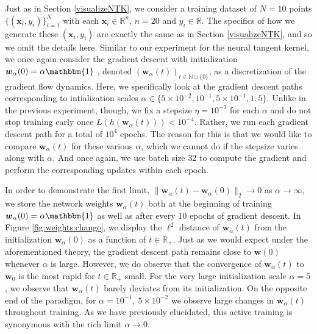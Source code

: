 \documentclass{article}
\begin{document}
Just as in Section \ref{visualizeNTK}, we consider a training dataset of $N = 10$ points $\{(\boldsymbol{x}_i, y_i) \}_{i=1}^N$ with each $\boldsymbol{x}_i \in \mathbb{R}^n$, $n=20$ and $y_i \in \mathbb{R}$. The specifics of how we generate these $(\boldsymbol{x}_i, y_i)$ are exactly the same as in Section \ref{visualizeNTK}, and so we omit the details here. Similar to our experiment for the neural tangent kernel, we once again consider the gradient descent with initialization $\boldsymbol{w}_{\alpha}(0) = \alpha \mathbbm{1}$ , denoted $(\boldsymbol{w}_{\alpha}(t))_{t \in \mathbb{N} \cup \{ 0\}}$, as a discretization of the gradient flow dynamics. Here, we specifically look at the gradient descent paths corresponding to intialization scales $\alpha \in \{ 5\times10^{-2}, 10^{-1}, 5 \times 10^{-1}, 1, 5\}$. Unlike in the previous experiment, though, we fix a stepsize $\eta = 10^{-3}$ for each $\alpha$ and do not stop training early once $L(h(\boldsymbol{w}_{\alpha}(t))) < 10^{-4}$. Rather, we run each gradient descent path for a total of $10^4$ epochs. The reason for this is that we would like to compare $\boldsymbol{w}_{\alpha}(t)$ for these various $\alpha$, which we cannot do if the stepsize varies along with $\alpha$. And once again, we use batch size $32$ to compute the gradient and perform the corresponding updates within each epoch.

In order to demonstrate the first limit, $\| \boldsymbol{w}_{\alpha}(t) - \boldsymbol{w}_{\alpha}(0) \|_2 \rightarrow 0$ as $\alpha \rightarrow \infty$, we store the network weights $\boldsymbol{w}_{\alpha}(t)$ both at the beginning of training $\boldsymbol{w}_{\alpha}(0) = \alpha \mathbbm{1}$ as well as after every 10 epochs of gradient descent. In Figure \ref{fig:weights:change}, we display the $\ell^2$ distance of $\boldsymbol{w}_{\alpha}(t)$ from the initialization $\boldsymbol{w}_{\alpha}(0)$ as a function of $t \in \mathbb{R}_+$. Just as we would expect under the aforementioned theory, the gradient descent path remains close to $\boldsymbol{w}(0)$ whenever $\alpha$ is large. However, we do observe that the convergence of $\boldsymbol{w}_{\alpha}(t)$ to $\boldsymbol{w}_0$ is the most rapid for $t \in \mathbb{R}_+$ small. For the very large initialization scale $\alpha = 5$, we observe that $\boldsymbol{w}_{\alpha}(t)$ barely deviates from its initialization. On the opposite end of the paradigm, for $\alpha = 10^{-1}, \ 5 \times 10^{-2}$ we observe large changes in $\boldsymbol{w}_{\alpha}(t)$ throughout training. As we have previously elucidated, this active training is synonymous with the rich limit $\alpha \rightarrow 0$.
\end{document}

